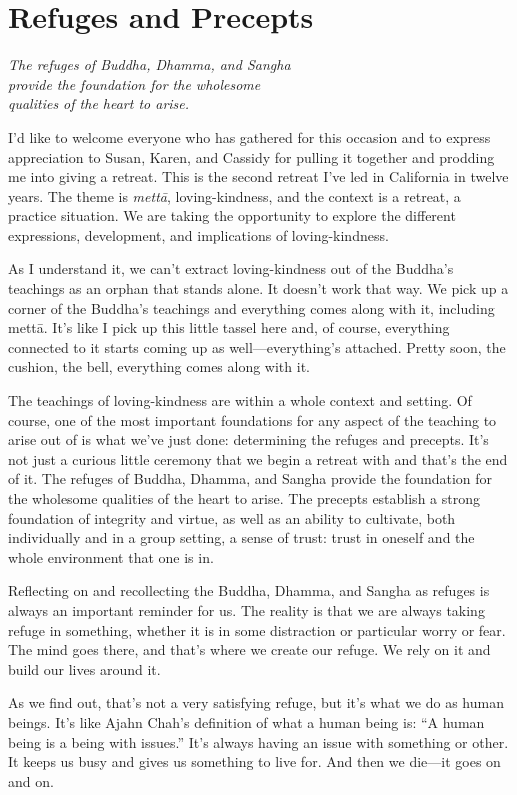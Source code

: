\chapter{Refuges and Precepts}

\epigraph{\emph{The refuges of Buddha, Dhamma, and Sangha\\provide the
foundation for the wholesome\\qualities of the heart to arise.}}{}

I’d like to welcome everyone who has gathered for this occasion and to
express appreciation to Susan, Karen, and Cassidy for pulling it
together and prodding me into giving a retreat. This is the second
retreat I’ve led in California in twelve years. The theme is
\emph{mettā}, loving-kindness, and the context is a retreat, a practice
situation. We are taking the opportunity to explore the different
expressions, development, and implications of loving-kindness.

As I understand it, we can’t extract loving-kindness out of the Buddha’s
teachings as an orphan that stands alone. It doesn’t work that way. We
pick up a corner of the Buddha’s teachings and everything comes along
with it, including mettā. It’s like I pick up this little tassel here
and, of course, everything connected to it starts coming up as
well—everything’s attached. Pretty soon, the cushion, the bell,
everything comes along with it.

The teachings of loving-kindness are within a whole context and setting.
Of course, one of the most important foundations for any aspect of the
teaching to arise out of is what we’ve just done: determining the
refuges and precepts. It’s not just a curious little ceremony that we
begin a retreat with and that’s the end of it. The refuges of Buddha,
Dhamma, and Sangha provide the foundation for the wholesome qualities of
the heart to arise. The precepts establish a strong foundation of
integrity and virtue, as well as an ability to cultivate, both
individually and in a group setting, a sense of trust: trust in oneself
and the whole environment that one is in.

Reflecting on and recollecting the Buddha, Dhamma, and Sangha as refuges
is always an important reminder for us. The reality is that we are
always taking refuge in something, whether it is in some distraction or
particular worry or fear. The mind goes there, and that’s where we
create our refuge. We rely on it and build our lives around it.

As we find out, that’s not a very satisfying refuge, but it’s what we do
as human beings. It’s like Ajahn Chah’s definition of what a human being
is: “A human being is a being with issues.” It’s always having an issue
with something or other. It keeps us busy and gives us something to live
for. And then we die—it goes on and on.

